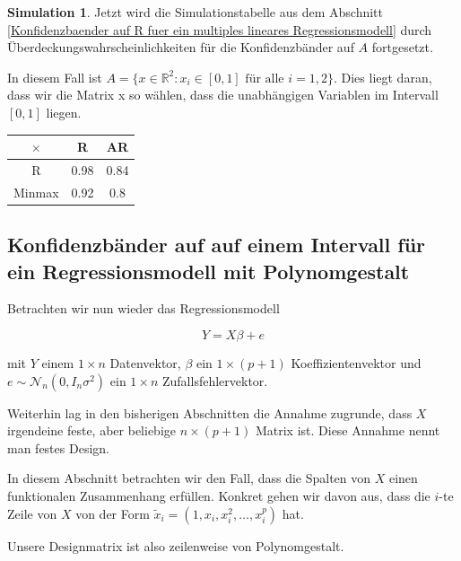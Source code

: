 \documentclass[12pt,a4paper]{article}
\theoremstyle{definition}
\theoremstyle{definition}
\theoremstyle{definition}
\newtheorem{Simulation}[Definition]{Simulation}
\theoremstyle{definition}
\newcommand{\UeberRR}{0.98}
\newcommand{\UeberRMinmax}{0.92}
\newcommand{\UeberARR}{0.84}
\newcommand{\UeberARMinmax}{0.8}
\begin{document}
\begin{Simulation}
Jetzt wird die Simulationstabelle aus dem Abschnitt \ref{Konfidenzbaender auf R fuer ein multiples lineares Regressionsmodell} durch Überdeckungswahrscheinlichkeiten für die Konfidenzbänder auf $A$ fortgesetzt. 

In diesem Fall ist $A = \{x \in \mathbb{R}^2 : x_i \in [0,1] \text{ für alle } i=1, 2 \}$. Dies liegt daran, dass wir die Matrix x so wählen, dass die unabhängigen Variablen im Intervall $[0,1]$ liegen.

\begin{center}
\begin{tabular}{|c|c|c|}
\hline 
$\times$ & R & AR \\ 
\hline 
R 		& \UeberRR & \UeberARR \\ 
\hline 
Minmax 	& \UeberRMinmax & \UeberARMinmax \\ 
\hline 
\end{tabular}
\end{center}

\end{Simulation}



\subsection{Konfidenzbänder auf auf einem Intervall für ein Regressionsmodell mit Polynomgestalt}
\label{Konfidenzbaenderauf auf einem Intervall für Regressionsmodell mit Polynomgestalt}
Betrachten wir nun wieder das Regressionsmodell 

\begin{equation*}
Y=X\beta+e
\end{equation*}

mit $Y$ einem $1 \times n$ Datenvektor, $\beta$ ein $1 \times (p+1)$ Koeffizientenvektor und $e \sim \mathscr{N}_{n}(0,I_n \sigma^2)$ ein $1 \times n$ Zufallsfehlervektor.

Weiterhin lag in den bisherigen Abschnitten die Annahme zugrunde, dass $X$ irgendeine feste, aber beliebige $n \times (p+1)$ Matrix ist. Diese Annahme nennt man festes Design.

In diesem Abschnitt betrachten wir den Fall, dass die Spalten von $X$ einen funktionalen Zusammenhang erfüllen. Konkret gehen wir davon aus, dass die $i$-te Zeile von $X$ von der Form $\tilde{x}_i = (1,x_i,x_{i}^{2},\ldots,x_{i}^{p})$ hat. 

Unsere Designmatrix ist also zeilenweise von Polynomgestalt. 
\end{document}
